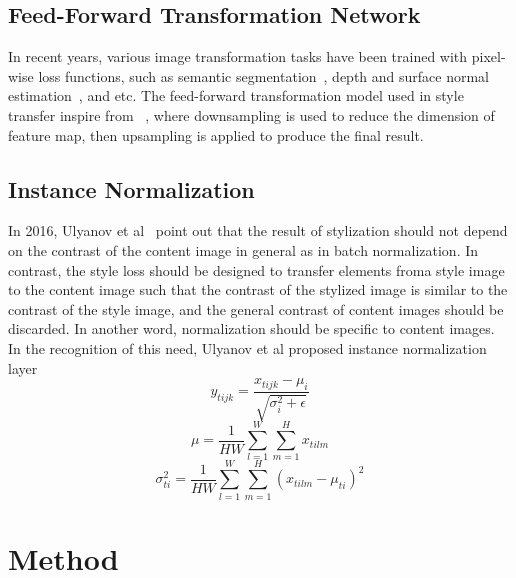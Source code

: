\documentclass[10pt,twocolumn,letterpaper]{article}
\begin{document}
\subsection{Feed-Forward Transformation Network}
In recent years, various image transformation tasks have been trained with pixel-wise loss functions, such as semantic segmentation~\cite{Long}, depth and surface normal estimation~\cite{Eigen}, and etc. The feed-forward transformation model used in style transfer inspire from ~\cite{Long}, where downsampling is used to reduce the dimension of feature map, then upsampling is applied to produce the final result. 

\subsection{Instance Normalization}
In 2016, Ulyanov et al~\cite{Ulyanov2} point out that the result of stylization should not depend on the contrast of the content image in general as in batch normalization. In contrast, the style loss should be designed to transfer elements froma style image to the content image such that the contrast of the stylized image is similar to the contrast of the style image, and the general contrast of content images should be discarded. In another word, normalization should be specific to content images. In the recognition of this need, Ulyanov et al proposed instance normalization layer
$$y_{tijk}=\frac{x_{tijk}-\mu_i}{\sqrt{\sigma_i^2+\epsilon}}$$
$$\mu=\frac{1}{HW}\sum_{l=1}^W\sum_{m=1}^H x_{tilm}$$
$$\sigma^2_{ti}=\frac{1}{HW}\sum_{l=1}^W\sum_{m=1}^H(x_{tilm}-\mu_{ti})^2$$

\section{Method}
\end{document}

